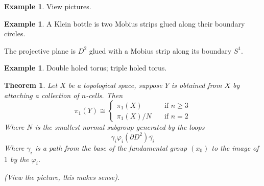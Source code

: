 \documentclass[11pt,a4paper]{article}
\theoremstyle{definition}
\newtheorem{example}[definition]{Example}
\theoremstyle{plain}
\newtheorem{theorem}[definition]{Theorem}
\theoremstyle{remark}
\newcommand{\1}{\mathbbm{1}}
\begin{document}
\begin{example}
    View pictures. 
\end{example}

\begin{example}
    A Klein bottle is two Mobius strips glued along their boundary circles. 

    The projective plane is $D^2$ glued with a Mobius strip along its boundary $S^1$.
\end{example}

\begin{example}
    Double holed torus; triple holed torus. 
\end{example}

\begin{theorem}
    Let $X$ be a topological space, suppose $Y$ is obtained from $X$ by attaching a collection of $n$-cells. Then 
    $$\pi_1(Y) \cong \begin{cases}
        \pi_1(X) \quad &\text{if } n \ge 3 \\
        \pi_1(X)/N \quad &\text{if } n = 2
    \end{cases} $$
    Where $N$ is the smallest normal subgroup generated by the loops 
    $$\gamma_i \varphi_i(\partial D^2) \overline{\gamma_i}$$
    Where $\gamma_i$ is a path from the base of the fundamental group $(x_0)$ to the image of $1$ by the $\varphi_i$. 

    (View the picture, this makes sense).
\end{theorem}
\end{document}
